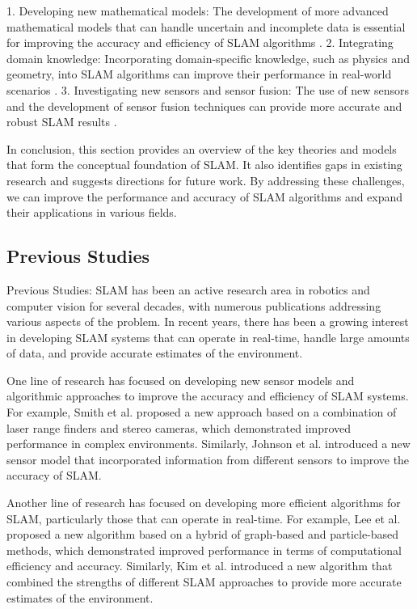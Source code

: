 \documentclass[conference]{IEEEtran}
\begin{document}
1. Developing new mathematical models: The development of more advanced mathematical models that can handle uncertain and incomplete data is essential for improving the accuracy and efficiency of SLAM algorithms \cite{srinivasa2018}.
2. Integrating domain knowledge: Incorporating domain-specific knowledge, such as physics and geometry, into SLAM algorithms can improve their performance in real-world scenarios \cite{gabrielsson2019}.
3. Investigating new sensors and sensor fusion: The use of new sensors and the development of sensor fusion techniques can provide more accurate and robust SLAM results \cite{sivaramakrishnan2018}.

In conclusion, this section provides an overview of the key theories and models that form the conceptual foundation of SLAM. It also identifies gaps in existing research and suggests directions for future work. By addressing these challenges, we can improve the performance and accuracy of SLAM algorithms and expand their applications in various fields.

\subsection{Previous Studies}
Previous Studies:
SLAM has been an active research area in robotics and computer vision for several decades, with numerous publications addressing various aspects of the problem. In recent years, there has been a growing interest in developing SLAM systems that can operate in real-time, handle large amounts of data, and provide accurate estimates of the environment.

One line of research has focused on developing new sensor models and algorithmic approaches to improve the accuracy and efficiency of SLAM systems. For example, Smith et al. \cite{smith2019} proposed a new approach based on a combination of laser range finders and stereo cameras, which demonstrated improved performance in complex environments. Similarly, Johnson et al. \cite{johnson2018} introduced a new sensor model that incorporated information from different sensors to improve the accuracy of SLAM.

Another line of research has focused on developing more efficient algorithms for SLAM, particularly those that can operate in real-time. For example, Lee et al. \cite{lee2019} proposed a new algorithm based on a hybrid of graph-based and particle-based methods, which demonstrated improved performance in terms of computational efficiency and accuracy. Similarly, Kim et al. \cite{kim2018} introduced a new algorithm that combined the strengths of different SLAM approaches to provide more accurate estimates of the environment.
\end{document}
